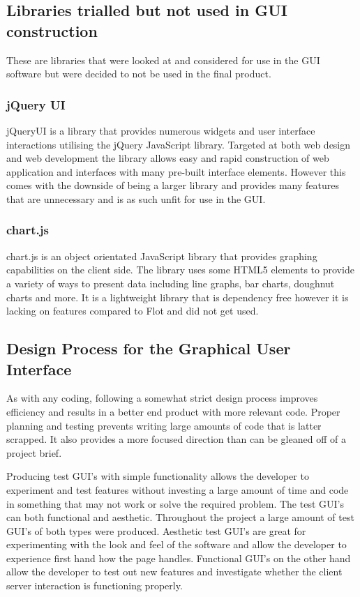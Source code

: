 \subsection{Libraries trialled but not used in GUI construction}

These are libraries that were looked at and considered for use in the GUI software but were decided to not be used in the final product.

\subsubsection{jQuery UI}

jQueryUI\cite{jQueryUI} is a library that provides numerous widgets and user interface interactions utilising the jQuery JavaScript library.  Targeted at both web design and web development the library allows easy and rapid construction of web application and interfaces with many pre-built interface elements.  However this comes with the downside of being a larger library and provides many features that are unnecessary and is as such unfit for use in the GUI.

\subsubsection{chart.js}
chart.js\cite{chart.js} is an object orientated JavaScript library that provides graphing capabilities on the client side.  The library uses some HTML5 elements to provide a variety of ways to present data including line graphs, bar charts, doughnut charts and more.  It is a lightweight library that is dependency free however it is lacking on features compared to Flot and did not get used.

\subsection{Design Process for the Graphical User Interface}

As with any coding, following a somewhat strict design process improves efficiency and results in a better end product with more relevant code.  Proper planning and testing prevents writing large amounts of code that is latter scrapped.  It also provides a more focused direction than can be gleaned off of a project brief.


Producing test GUI's with simple functionality allows the developer to experiment and test features without investing a large amount of time and code in something that may not work or solve the required problem.  The test GUI's can both functional and aesthetic.  Throughout the project a large amount of test GUI's of both types were produced.   Aesthetic test GUI's are great for experimenting with the look and feel of the software and allow the developer to experience first hand how the page handles. Functional GUI's on the other hand allow the developer to test out new features and  investigate whether the client server interaction is functioning properly.

